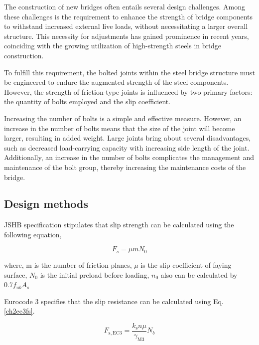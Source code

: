 The construction of new bridges often entails several design challenges. Among these challenges is the requirement to enhance the strength of bridge components to withstand increased external live loads, without necessitating a larger overall structure. This necessity for adjustments has gained prominence in recent years, coinciding with the growing utilization of high-strength steels in bridge construction.

To fulfill this requirement, the bolted joints within the steel bridge structure must be engineered to endure the augmented strength of the steel components. However, the strength of friction-type joints is influenced by two primary factors: the quantity of bolts employed and the slip coefficient. 

Increasing the number of bolts is a simple and effective measure. However, an increase in the number of bolts means that the size of the joint will become larger, resulting in added weight. Large joints bring about several disadvantages, such as decreased load-carrying capacity with increasing side length of the joint. Additionally, an increase in the number of bolts complicates the management and maintenance of the bolt group, thereby increasing the maintenance costs of the bridge.

\subsection{Design methods}


\ac{JSHB}\cite{douji2017} specification stipulates that slip strength can be calculated using the following equation,

\begin{equation} \label{ch2fs}
    F_s=\mu m N_0
\end{equation}

where, m is the number of friction planes, $\mu$ is the slip coefficient of faying surface, $N_0$ is the initial preload before loading, $n_0$ also can be calculated by $0.7f_{ub}A_s$

Eurocode 3 \cite{eurocode3-21} specifies that the slip resistance can be calculated using Eq. \ref{ch2ec3fs}.

\begin{equation} \label{ch2ec3fs}
F_{\mathrm{s}, \mathrm{EC3}}=\frac{k_{\mathrm{s}} n \mu}{\gamma_{\mathrm{M} 3}} N_b
\end{equation}


